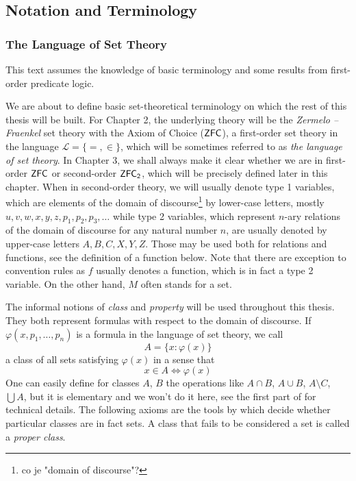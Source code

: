 \subsection{Notation and Terminology}
\subsubsection{The Language of Set Theory}
This text assumes the knowledge of basic terminology and some results from first-order predicate logic.

We are about to define basic set-theoretical terminology on which the rest of this thesis will be built. For Chapter 2, the underlying theory will be the \emph{Zermelo –Fraenkel} set theory with the Axiom of Choice ($\sf{ZFC}$), a first-order set theory in the language $\mathscr{L} = \{=, \in\}$, which will be sometimes referred to as \emph{the language of set theory}. In Chapter 3, we shall always make it clear whether we are in first-order $\sf{ZFC}$ or second-order $\sf{ZFC}_2$, which will be precisely defined later in this chapter. When in second-order theory, we will usually denote type 1 variables, which are elements of the domain of discourse\footnote{co je "domain of discourse"?} by lower-case letters, mostly $u, v, w, x, y, z, p_1, p_2, p_3,  \ldots$ while type 2 variables, which represent $n$-ary relations of the domain of discourse for any natural number $n$, are usually denoted by upper-case letters $A, B, C, X, Y, Z$. Those may be used both for relations and functions, see the definition of a function below. Note that there are exception to convention rules as $f$ usually denotes a function, which is in fact a type 2 variable. On the other hand, $M$ often stands for a set.


The informal notions of \emph{class} and \emph{property} will be used throughout this thesis. They both represent formulas with respect to the domain of discourse. If $\varphi(x, p_1, \ldots, p_n)$ is a formula in the language of set theory, we call 
\begin{equation}
A = \{x : \varphi(x)\}
\end{equation}
a class of all sets satisfying $\varphi(x)$ in a sense that 
\begin{equation}
x \in A \iff \varphi(x)
\end{equation}
One can easily define for classes $A$, $B$ the operations like $A \cap B$, $A \cup B$, $A \setminus C$, $\bigcup A$, but it is elementary and we won't do it here, see the first part of \cite{JechBook} for technical details. The following axioms are the tools by which decide whether particular classes are in fact sets. A class that fails to be considered a set is called a \emph{proper class}.

